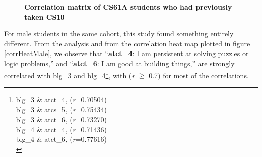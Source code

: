 \documentclass[oneside,titlepage,numbers=noenddot,headinclude,%
               footinclude=true,cleardoublepage=empty,abstractoff,BCOR=2mm,%
               paper=a4,fontsize=11pt,ngerman,american]{scrreprt}
\numberwithin{theorem}{chapter}
\numberwithin{definition}{chapter}
\numberwithin{algorithm}{chapter}
\numberwithin{figure}{chapter}
\numberwithin{table}{chapter}
\numberwithin{equation}{chapter}
\begin{document}
\begin{figure}[!htbp]
    \centering
\caption{\textbf{Correlation matrix of CS61A students who had previously taken CS10}}
\label{corrHeatMapFemaleCS10CS61A}
\end{figure}


For male students in the same cohort, this study found something entirely different. From the analysis and from the correlation heat map plotted in figure \ref{corrHeatMale}, we observe that ``\textbf{atct\_4}: I am persistent at solving puzzles or logic problems,'' and ``\textbf{atct\_6}: I am good at building things,'' are strongly correlated with blg\_3 and blg\_4\footnote{ %
blg\_3 \& atct\_4, (\emph{r}=0.70504)\\
blg\_3 \& atcs\_5, (\emph{r}=0.75434)\\
blg\_3 \& atct\_6, (\emph{r}=0.73270)\\
blg\_4 \& atct\_4, (\emph{r}=0.71436)\\
blg\_4 \& atct\_6, (\emph{r}=0.77616)\\
}, with (\emph{r} $\geq$ 0.7) for most of the correlations. 
 
\end{document}
